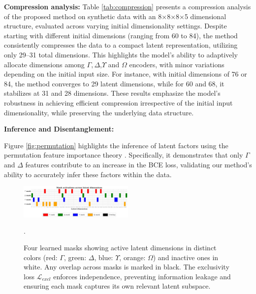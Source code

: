 \documentclass[doubleblind]{ecai}
\begin{document}
	
	\textbf{Compression analysis:} Table \ref{tab:compression} presents a compression analysis of the proposed method on synthetic data with an 8×8×8×5 dimensional structure, evaluated across varying initial dimensionality settings. Despite starting with different initial dimensions (ranging from 60 to 84), the method consistently compresses the data to a compact latent representation, utilizing only 29–31 total dimensions. This highlights the model's ability to adaptively allocate dimensions among $\Gamma,\Delta$,$\Upsilon$ and $\Omega$ encoders, with minor variations depending on the initial input size. For instance, with initial dimensions of 76 or 84, the method converges to 29 latent dimensions, while for 60 and 68, it stabilizes at 31 and 28 dimensions. These results emphasize the model's robustness in achieving efficient compression irrespective of the initial input dimensionality, while preserving the underlying data structure.
	
	
	
	\textbf{Inference and Disentanglement:}
	
	Figure \ref{fig:permutation} highlights the inference of latent factors using the permutation feature importance theory \citep{Fisher,Khan2024OnTE}. Specifically, it demonstrates that only $\Gamma$ and $\Delta$ features contribute to an increase in the BCE loss, validating our method's ability to accurately infer these factors within the data.
	
	\begin{figure}[h]
		\centering
		
		\includegraphics[width=0.5\textwidth]{Images/orthogonal_new_2.png}
		\caption{
			Four learned masks showing active latent dimensions in distinct colors 
			(red: $\Gamma$, green: $\Delta$, blue: $\Upsilon$, orange: $\Omega$) and inactive ones in white. 
			Any overlap across masks is marked in black. The exclusivity loss $\mathcal{L}_{\mathit{excl}}$ enforces independence, 
			preventing information leakage and ensuring each mask captures its own relevant latent subspace.
		}
		
		.
		
		
		\label{fig:ortho}
		
	\end{figure}
\end{document}

